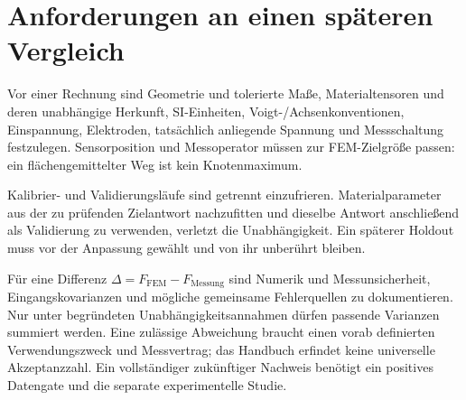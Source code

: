 \section{Anforderungen an einen späteren Vergleich}
Vor einer Rechnung sind Geometrie und tolerierte Maße, Materialtensoren und
deren unabhängige Herkunft, SI-Einheiten, Voigt-/Achsenkonventionen,
Einspannung, Elektroden, tatsächlich anliegende Spannung und Messschaltung
festzulegen. Sensorposition und Messoperator müssen zur FEM-Zielgröße passen:
ein flächengemittelter Weg ist kein Knotenmaximum.

Kalibrier- und Validierungsläufe sind getrennt einzufrieren. Materialparameter
aus der zu prüfenden Zielantwort nachzufitten und dieselbe Antwort anschließend
als Validierung zu verwenden, verletzt die Unabhängigkeit. Ein späterer
Holdout muss vor der Anpassung gewählt und von ihr unberührt bleiben.

Für eine Differenz $\Delta=F_{\mathrm{FEM}}-F_{\mathrm{Messung}}$ sind
Numerik und Messunsicherheit, Eingangskovarianzen und mögliche gemeinsame
Fehlerquellen zu dokumentieren. Nur unter begründeten Unabhängigkeitsannahmen
dürfen passende Varianzen summiert werden. Eine zulässige Abweichung braucht
einen vorab definierten Verwendungszweck und Messvertrag; das Handbuch erfindet
keine universelle Akzeptanzzahl. Ein vollständiger zukünftiger Nachweis benötigt
ein positives Datengate und die separate experimentelle Studie.
